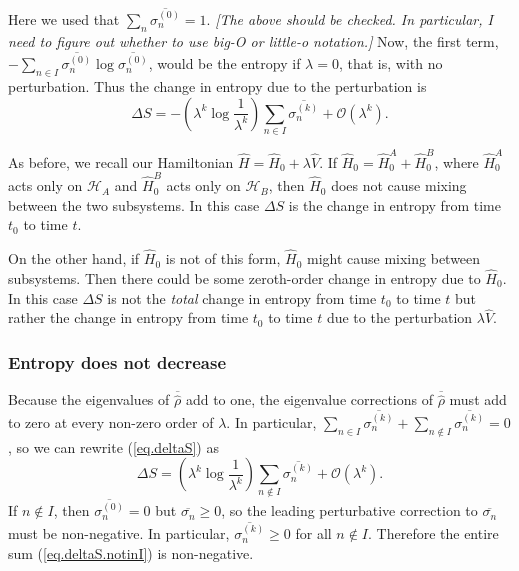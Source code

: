\documentclass[11pt]{article}
\newcommand{\Od}[1]{\mathcal{O}{\left(#1\right)}}
\newcommand{\hilb}{\mathcal{H}}
\newcommand{\op}[1]{\hat{#1}}
\theoremstyle{theorem}
\theoremstyle{remark}
\theoremstyle{step}
\theoremstyle{gap}
\begin{document}
Here we used that \(\sum_n \overline{\sigma_n^{(0)}} = 1\).
\emph{[The above should be checked. In particular, I need to figure out whether to use big-O or little-o notation.]}
Now, the first term, \(- \sum_{n \in I} \overline{\sigma_n^{(0)}} \log \overline{\sigma_n^{(0)}}\), would be the entropy if \(\lambda=0\), that is, with no perturbation. Thus the change in entropy due to the perturbation is
\begin{equation}\label{eq.deltaS}
\boxed{\Delta S = -\left(\lambda^k\log\frac{1}{\lambda^{k}} \right)\sum_{n \in I} \overline{\sigma_n^{(k)}} + \Od{\lambda^k}.}
\end{equation}

As before, we recall our Hamiltonian \(\op{H} = \op{H}_0 + \lambda \op{V}\).
If \(\op{H}_0 = \op{H}_0^A + \op{H}_0^B\), where \(\op{H}_0^A\) acts only on \(\hilb_A\) and \(\op{H}_0^B\) acts only on \(\hilb_B\), then \(\op{H}_0\) does not cause mixing between the two subsystems. In this case \(\Delta S\) is the change in entropy from time \(t_0\) to time \(t\).

On the other hand, if \(\op{H}_0\) is not of this form, \(\op{H}_0\) might cause mixing between subsystems. Then there could be some zeroth-order change in entropy due to \(\op{H}_0\). In this case \(\Delta S\) is not the \emph{total} change in entropy from time \(t_0\) to time \(t\) but rather the change in entropy from time \(t_0\) to time \(t\) due to the perturbation \(\lambda \op{V}\).

\subsubsection{Entropy does not decrease}

Because the eigenvalues of \(\overline{\op{\rho}}\) add to one, the eigenvalue corrections of \(\overline{\op{\rho}}\) must add to zero at every non-zero order of \(\lambda\). In particular, \(\sum_{n \in I} \overline{\sigma_n^{(k)}} + \sum_{n \not \in I} \overline{\sigma_n^{(k)}} = 0\), so we can rewrite (\ref{eq.deltaS}) as
\begin{equation}\label{eq.deltaS.notinI}
\Delta S = \left(\lambda^k \log \frac{1}{\lambda^k}\right) \sum_{n \not \in I} \overline{\sigma_n^{(k)}} + \Od{\lambda^k}.
\end{equation}
If \(n \not\in I\), then \(\overline{\sigma_n^{(0)}} = 0\) but \(\overline{\sigma_n}\geq 0\), so the leading perturbative correction to \(\overline{\sigma_n}\) must be non-negative. In particular, \(\overline{\sigma_n^{(k)}} \geq 0\) for all \(n \not\in I\). Therefore the entire sum (\ref{eq.deltaS.notinI}) is non-negative.
\end{document}
